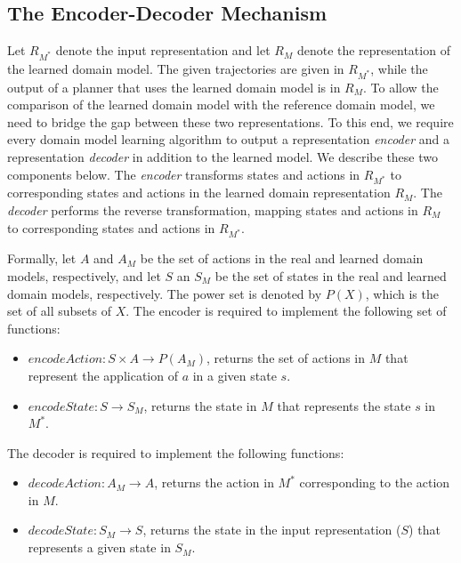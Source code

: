 \documentclass{article}
\theoremstyle{definition}
\theoremstyle{remark}
\newcommand{\realm}{\ensuremath{M^*}\xspace}
\begin{document}
\subsection{The Encoder-Decoder Mechanism}
Let $R_{\realm}$ denote the input representation and let $R_M$ denote the representation of the learned domain model. 
The given trajectories are given in $R_{\realm}$, 
while the output of a planner that uses the learned domain model is in $R_M$. 
To allow the comparison of the learned domain model with the reference domain model, we need to bridge the gap between these two representations. 
To this end, we require every domain model learning algorithm to output 
a representation \emph{encoder} and a representation \emph{decoder} in addition to the learned model. We describe these two components below.  
The \emph{encoder} transforms states and actions in $R_{\realm}$ to corresponding states and actions in the learned domain representation $R_M$. 
The \emph{decoder} performs the reverse transformation, mapping states and actions in $R_M$ to corresponding states and actions in $R_\realm$.


Formally, let $A$ and $A_M$ be the set of actions in the real and learned domain models, respectively, and let $S$ an $S_M$ be the set of states in the real and learned domain models, respectively. The power set is denoted by $P(X)$, which is the set of all subsets of $X$. 
The encoder is required to implement the following set of functions:
\begin{itemize}
    \item ${\mathit{encodeAction}: S\times A\rightarrow P(A_M)}$, returns the set of actions in $M$ that represent the application of $a$ in a given state $s$. 
    \item ${\mathit{encodeState}: S\rightarrow S_M}$, returns the state in $M$ that represents the state $s$ in $\realm$.
\end{itemize}
The decoder is required to implement the following functions:
\begin{itemize}
    \item ${\mathit{decodeAction}: A_M\rightarrow A}$, returns the action in $\realm$ corresponding to the action in $M$. 
    \item ${\mathit{decodeState}: S_M\rightarrow S}$, returns the state in the input representation ($S$) that represents a given state in $S_M$. 
\end{itemize}
\end{document}
